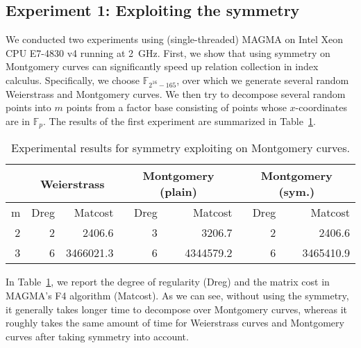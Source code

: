 \documentclass{llncs}
\newcommand{\F}[1]{\ensuremath{\mathbb F_{#1}}}
\begin{document}
\subsection{Experiment 1: Exploiting the symmetry}
%
We conducted two experiments using (single-threaded) MAGMA on Intel
Xeon CPU E7-4830 v4 running at 2~GHz.
%
First, we show that using symmetry on Montgomery curves can
significantly speed up relation collection in index calculus.
%
Specifically, we choose $\F{2^{16} - 165}$, over which we generate
several random Weierstrass and Montgomery curves.
%
We then try to decompose several random points into $m$ points from a
factor base consisting of points whose $x$-coordinates are in \F p.
%
The results of the first experiment are summarized in
Table~\ref{tab:exp-sym}.
%
\begin{table}
  \begin{center}
    \begin{tabular}{|r||r|r|r|r|r|r|}
      \hline
      & \multicolumn{2}{c|}{Weierstrass} & \multicolumn{2}{c|}{Montgomery (plain)} & \multicolumn{2}{c|}{Montgomery (sym.)} \\ \hline\hline
      m & Dreg     & Matcost      & Dreg     & Matcost      & Dreg     & Matcost      \\ \hline
      2 & 2        & 2406.6      & 3        & 3206.7      & 2        & 2406.6      \\ \hline
      3 & 6        & 3466021.3    & 6        & 4344579.2    & 6        & 3465410.9    \\ \hline
    \end{tabular}
  \end{center}
  \caption{Experimental results for symmetry exploiting on Montgomery curves.}
  \label{tab:exp-sym}
\end{table}
%
In Table~\ref{tab:exp-sym}, we report the degree of regularity (Dreg)
and the matrix cost in MAGMA's F4 algorithm (Matcost).
%
As we can see, without using the symmetry, it generally takes longer
time to decompose over Montgomery curves, whereas it roughly takes the
same amount of time for Weierstrass curves and Montgomery curves after
taking symmetry into account.
\end{document}
